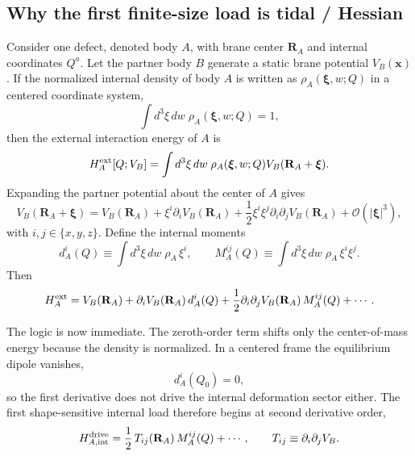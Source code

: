 \documentclass[11pt]{article}
\theoremstyle{plain}
\theoremstyle{definition}
\theoremstyle{remark}
\newcommand{\Order}[1]{\mathcal{O}\!\left(#1\right)}
\begin{document}
\subsection{Why the first finite-size load is tidal / Hessian}\label{subsec:finite-hessian-load}

Consider one defect, denoted body $A$, with brane center $\mathbf R_A$ and internal coordinates $Q^a$. Let the partner body $B$ generate a static brane potential $V_B(\mathbf x)$. If the normalized internal density of body $A$ is written as $\rho_A(\boldsymbol\xi,w;Q)$ in a centered coordinate system,
\begin{equation}
\int d^3\xi\,dw\;\rho_A(\boldsymbol\xi,w;Q)=1,
\label{eq:finite-density-normalization}
\end{equation}
then the external interaction energy of $A$ is
\begin{equation}
H_A^{\rm ext}[Q;V_B]
=
\int d^3\xi\,dw\;\rho_A(\boldsymbol\xi,w;Q)
V_B(\mathbf R_A+\boldsymbol\xi).
\label{eq:finite-external-energy}
\end{equation}
Expanding the partner potential about the center of $A$ gives
\begin{equation}
V_B(\mathbf R_A+\boldsymbol\xi)
=
V_B(\mathbf R_A)
+\xi^i\partial_iV_B(\mathbf R_A)
+\frac12\xi^i\xi^j\partial_i\partial_jV_B(\mathbf R_A)
+\Order{|\boldsymbol\xi|^3},
\label{eq:finite-potential-expansion}
\end{equation}
with $i,j\in\{x,y,z\}$. Define the internal moments
\begin{equation}
d_A^i(Q)
\equiv
\int d^3\xi\,dw\;\rho_A\,\xi^i,
\qquad
M_A^{ij}(Q)
\equiv
\int d^3\xi\,dw\;\rho_A\,\xi^i\xi^j.
\label{eq:finite-moment-definitions}
\end{equation}
Then
\begin{equation}
H_A^{\rm ext}
=
V_B(\mathbf R_A)
+\partial_iV_B(\mathbf R_A)\,d_A^i(Q)
+\frac12\partial_i\partial_jV_B(\mathbf R_A)\,M_A^{ij}(Q)
+\cdots.
\label{eq:finite-external-energy-expanded}
\end{equation}

The logic is now immediate. The zeroth-order term shifts only the center-of-mass energy because the density is normalized. In a centered frame the equilibrium dipole vanishes,
\begin{equation}
d_A^i(Q_0)=0,
\label{eq:finite-centered-frame}
\end{equation}
so the first derivative does not drive the internal deformation sector either. The first shape-sensitive internal load therefore begins at second derivative order,
\begin{equation}
H_{A,\rm int}^{\rm drive}
=
\frac12\,T_{ij}(\mathbf R_A)\,M_A^{ij}(Q)+\cdots,
\qquad
T_{ij}\equiv \partial_i\partial_jV_B.
\label{eq:finite-hessian-load}
\end{equation}
\end{document}
